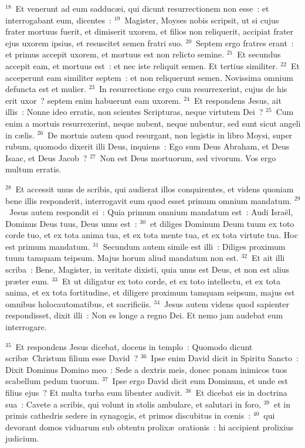 ${}^{18}$~Et venerunt ad eum sadduc\ae i, qui dicunt resurrectionem non esse~: et interrogabant eum, dicentes~:
${}^{19}$~Magister, Moyses nobis scripsit, ut si cujus frater mortuus fuerit, et dimiserit uxorem, et filios non reliquerit, accipiat frater ejus uxorem ipsius, et resuscitet semen fratri suo.
${}^{20}$~Septem ergo fratres erant~: et primus accepit uxorem, et mortuus est non relicto semine.
${}^{21}$~Et secundus accepit eam, et mortuus est~: et nec iste reliquit semen. Et tertius similiter.
${}^{22}$~Et acceperunt eam similiter septem~: et non reliquerunt semen. Novissima omnium defuncta est et mulier.
${}^{23}$~In resurrectione ergo cum resurrexerint, cujus de his erit uxor~? septem enim habuerunt eam uxorem.
${}^{24}$~Et respondens Jesus, ait illis~: Nonne ideo erratis, non scientes Scripturas, neque virtutem Dei~?
${}^{25}$~Cum enim a mortuis resurrexerint, neque nubent, neque nubentur, sed sunt sicut angeli in c\ae lis.
${}^{26}$~De mortuis autem quod resurgant, non legistis in libro Moysi, super rubum, quomodo dixerit illi Deus, inquiens~: Ego sum Deus Abraham, et Deus Isaac, et Deus Jacob~?
${}^{27}$~Non est Deus mortuorum, sed vivorum. Vos ergo multum erratis.


${}^{28}$~Et accessit unus de scribis, qui audierat illos conquirentes, et videns quoniam bene illis responderit, interrogavit eum quod esset primum omnium mandatum.
${}^{29}$~Jesus autem respondit ei~: Quia primum omnium mandatum est~: Audi Isra\"el, Dominus Deus tuus, Deus unus est~:
${}^{30}$~et diliges Dominum Deum tuum ex toto corde tuo, et ex tota anima tua, et ex tota mente tua, et ex tota virtute tua. Hoc est primum mandatum.
${}^{31}$~Secundum autem simile est illi~: Diliges proximum tuum tamquam teipsum. Majus horum aliud mandatum non est.
${}^{32}$~Et ait illi scriba~: Bene, Magister, in veritate dixisti, quia unus est Deus, et non est alius pr\ae ter eum.
${}^{33}$~Et ut diligatur ex toto corde, et ex toto intellectu, et ex tota anima, et ex tota fortitudine, et diligere proximum tamquam seipsum, majus est omnibus holocautomatibus, et sacrificiis.
${}^{34}$~Jesus autem videns quod sapienter respondisset, dixit illi~: Non es longe a regno Dei. Et nemo jam audebat eum interrogare.


${}^{35}$~Et respondens Jesus dicebat, docens in templo~: Quomodo dicunt scrib\ae\ Christum filium esse David~?
${}^{36}$~Ipse enim David dicit in Spiritu Sancto~: Dixit Dominus Domino meo~: Sede a dextris meis, donec ponam inimicos tuos scabellum pedum tuorum.
${}^{37}$~Ipse ergo David dicit eum Dominum, et unde est filius ejus~? Et multa turba eum libenter audivit.
${}^{38}$~Et dicebat eis in doctrina sua~: Cavete a scribis, qui volunt in stolis ambulare, et salutari in foro,
${}^{39}$~et in primis cathedris sedere in synagogis, et primos discubitus in cœnis~:
${}^{40}$~qui devorant domos viduarum sub obtentu prolix\ae\ orationis~: hi accipient prolixius judicium.


